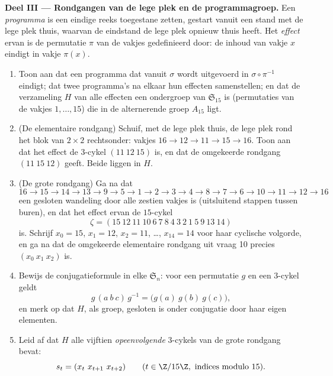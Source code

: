 \begin{problem}
\medskip
\noindent\textbf{Deel III --- Rondgangen van de lege plek en de
programmagroep.} Een \emph{programma} is een eindige reeks
toegestane zetten, gestart vanuit een stand met de lege plek
thuis, waarvan de eindstand de lege plek opnieuw thuis heeft. Het
\emph{effect} ervan is de permutatie $\pi$ van de vakjes
gedefinieerd door: de inhoud van vakje $x$ eindigt in vakje
$\pi(x)$.
\begin{enumerate}[resume]
  \item Toon aan dat een programma dat vanuit $\sigma$ wordt
        uitgevoerd in $\sigma \circ \pi^{-1}$ eindigt; dat twee
        programma's na elkaar hun effecten samenstellen; en dat de
        verzameling $H$ van alle effecten een ondergroep van
        $\mathfrak{S}_{15}$ is (permutaties van de vakjes $1,
        \dots, 15$) die in de alternerende groep $A_{15}$ ligt.
  \item (De elementaire rondgang) Schuif, met de lege plek thuis,
        de lege plek rond het blok van $2 \times 2$ rechtsonder:
        vakjes $16 \to 12 \to 11 \to 15 \to 16$. Toon aan dat het
        effect de $3$-cykel $(11\ 12\ 15)$ is, en dat de
        omgekeerde rondgang $(11\ 15\ 12)$ geeft. Beide liggen in
        $H$.
  \item (De grote rondgang) Ga na dat
        \[
        16 \to 15 \to 14 \to 13 \to 9 \to 5 \to 1 \to 2 \to 3
        \to 4 \to 8 \to 7 \to 6 \to 10 \to 11 \to 12 \to 16
        \]
        een gesloten wandeling door alle zestien vakjes is
        (uitsluitend stappen tussen buren), en dat het effect
        ervan de $15$-cykel
        \[
        \zeta = (15\ 12\ 11\ 10\ 6\ 7\ 8\ 4\ 3\ 2\ 1\ 5\ 9\ 13\
        14)
        \]
        is. Schrijf $x_0 = 15$, $x_1 = 12$, $x_2 = 11$, \dots,
        $x_{14} = 14$ voor haar cyclische volgorde, en ga na dat
        de omgekeerde elementaire rondgang uit vraag 10 precies
        $(x_0\ x_1\ x_2)$ is.
  \item Bewijs de conjugatieformule in elke $\mathfrak{S}_n$: voor
        een permutatie $g$ en een $3$-cykel geldt
        \[
        g\,(a\ b\ c)\,g^{-1} = \bigl(g(a)\ g(b)\ g(c)\bigr),
        \]
        en merk op dat $H$, als groep, gesloten is onder conjugatie
        door haar eigen elementen.
  \item Leid af dat $H$ alle vijftien \emph{opeenvolgende}
        $3$-cykels van de grote rondgang bevat:
        \[
        s_t = (x_t\ x_{t+1}\ x_{t+2}) \qquad (t \in \Z/15\Z,
        \text{ indices modulo } 15).
        \]
\end{enumerate}


\end{problem}
